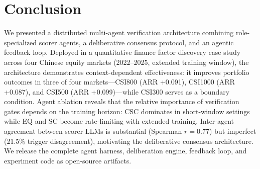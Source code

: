\documentclass[sigconf]{acmart}
\begin{document}
\section{Conclusion}

We presented a distributed multi-agent verification architecture combining role-specialized scorer agents, a deliberative consensus protocol, and an agentic feedback loop. Deployed in a quantitative finance factor discovery case study across four Chinese equity markets (2022--2025, extended training window), the architecture demonstrates context-dependent effectiveness: it improves portfolio outcomes in three of four markets---CSI800 (ARR +0.091), CSI1000 (ARR +0.087), and CSI500 (ARR +0.099)---while CSI300 serves as a boundary condition. Agent ablation reveals that the relative importance of verification gates depends on the training horizon: CSC dominates in short-window settings while EQ and SC become rate-limiting with extended training. Inter-agent agreement between scorer LLMs is substantial (Spearman $r=0.77$) but imperfect (21.5\% trigger disagreement), motivating the deliberative consensus architecture. We release the complete agent harness, deliberation engine, feedback loop, and experiment code as open-source artifacts.




\end{document}
